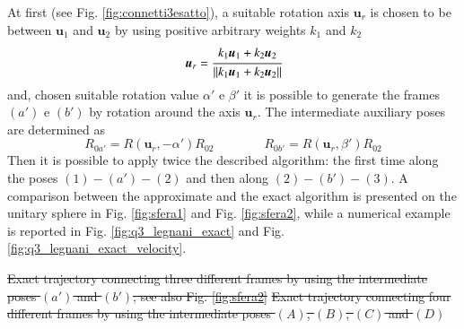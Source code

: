 \documentclass[preprint, 12pt]{elsarticle}
\def\vect#1{{\boldsymbol{#1}}}
\newcommand{\norm}[1]{\left\lVert#1\right\rVert}
\providecommand{\DIFdel}[1]{{\protect\color{red}\sout{#1}}}                      %
\providecommand{\DIFaddbegin}{} %
\providecommand{\DIFaddend}{} %
\providecommand{\DIFdelbegin}{} %
\providecommand{\DIFdelend}{} %
\providecommand{\DIFdelFL}[1]{\DIFdel{#1}} %
\begin{document}
At first (see Fig. \ref{fig:connetti3esatto}), a suitable rotation axis $\vect{u}_r$ is chosen to be between $\vect{u}_1$ and $\vect{u}_2$ by using positive arbitrary weights $k_1$ and $k_2$
\begin{equation}
    \vect{u}_r= \cfrac{k_1 \vect{u}_1 + k_2 \vect{u}_2}{\norm{k_1 \vect{u}_1 + k_2 \vect{u}_2}}
    \DIFdelbegin %
\DIFdelend %
    \DIFaddbegin \label{eq:Ur}
\DIFaddend \end{equation}
and, chosen suitable rotation value  $\alpha'$ e $\beta'$ it is possible to generate the frames $(a')$ e $(b')$ by rotation around the axis $\vect{u}_r$. The intermediate auxiliary poses are determined as
\begin{equation}
    R_{0a'}=R(\vect{u}_r,-\alpha')R_{02} 
    \qquad\qquad   
    R_{0b'}=R(\vect{u}_r,\beta')R_{02}
    \label{eq:auxiliary}
\end{equation}
Then it is possible to apply twice the described algorithm: the first time along the poses $(1)-(a')-(2)$ and then along $(2)-(b')-(3)$. A comparison between the approximate and the exact algorithm is presented on the unitary sphere in Fig. \ref{fig:sfera1} and Fig. \ref{fig:sfera2}, while a numerical example is reported in Fig. \ref{fig:q3_legnani_exact} and Fig. \ref{fig:q3_legnani_exact_velocity}.


\DIFdelbegin %
{%
\DIFdelFL{Exact trajectory connecting three different frames by using the intermediate poses $(a')$ and $(b')$; see also Fig. \ref{fig:sfera2}}}
{%
\DIFdelFL{Exact trajectory connecting four different frames by using the intermediate poses $(A)$, $(B)$, $(C)$ and $(D)$}}
\end{document}
